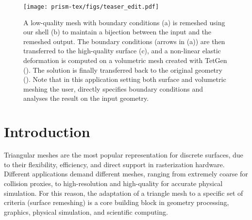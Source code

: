 
\begin{figure}
	\centering
	\texttt{[image: prism-tex/figs/teaser\_edit.pdf]}
    \caption{A low-quality mesh with boundary conditions (a)
    is remeshed using our shell (b)
    to maintain a bijection between the input and the remeshed output.
    The boundary conditions (arrows in (a)) are then transferred to the high-quality surface (c),
    and a non-linear elastic deformation is computed %
    on a volumetric mesh created with TetGen ().
    The solution is finally transferred back to the original geometry ().
    Note that in this application setting both surface and volumetric meshing  the user,  directly specifies boundary conditions and analyses the result on the input geometry.}
    
    \label{prism:fig:teaser}
\end{figure}

\section{Introduction}
\label{sec:introduction}

Triangular meshes are the most popular representation for discrete surfaces, due to their flexibility, efficiency, and direct support in rasterization hardware. Different applications demand different meshes, ranging from extremely coarse for collision proxies, to high-resolution and high-quality for accurate physical simulation.
%
For this reason, the adaptation of a triangle mesh to a specific set of criteria (surface remeshing) is a core building block in geometry processing, graphics, physical simulation, and scientific computing.

